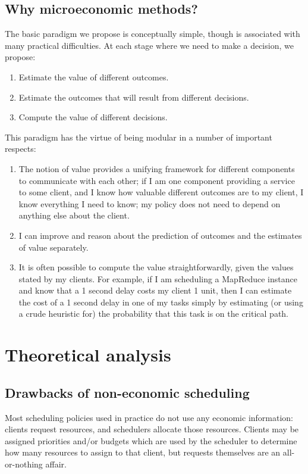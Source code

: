 \documentclass{acm_proc_article-sp}
\begin{document}
\subsection{Why microeconomic methods?}
The basic paradigm we propose is conceptually simple, though is associated with
many practical difficulties. At each stage where we need to make a decision, we
propose:
\begin{enumerate}
  \item Estimate the value of different outcomes.
  \item Estimate the outcomes that will result from different decisions.
  \item Compute the value of different decisions.
\end{enumerate}
    
This paradigm has the virtue of being modular in a number of important respects:
\begin{enumerate}
  \item The notion of value provides a unifying framework for different
    components to communicate with each other; if I am one component providing a
    service to some client, and I know how valuable different outcomes are to my
    client, I know everything I need to know; my policy does not need to depend
    on anything else about the client.
  \item I can improve and reason about the prediction of outcomes and the
    estimates of value separately. 
  \item It is often possible to compute the value straightforwardly, given the
    values stated  by my clients. For example, if I am scheduling a MapReduce
    instance and know that a 1 second delay costs my client 1 unit, then I can
    estimate the cost of a 1 second delay in one of my tasks simply by
    estimating (or using a crude heuristic for) the probability that this task
    is on the critical path.
\end{enumerate}

\section{Theoretical analysis}

\subsection{Drawbacks of non-economic scheduling}
Most scheduling policies used in practice do not use any economic information: clients request resources, and schedulers allocate those resources. Clients may be assigned priorities and/or budgets which are used by the scheduler to determine how many resources to assign to that client, but requests themselves are an all-or-nothing affair.
\end{document}
